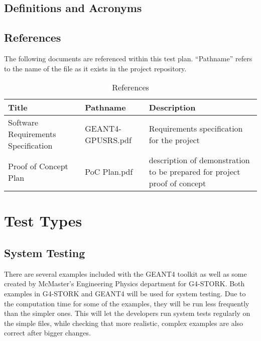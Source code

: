 \documentclass[12pt]{article}
\begin{document}
\subsection{Definitions and Acronyms} %

\subsection{References}
The following documents are referenced within this test plan. ``Pathname'' refers to the name of the file as it exists in the project repository.
\begin{table}[h]
\centering
\caption{References}\label{Table_References}
\begin{tabular}{>{\raggedright\arraybackslash}p{}>{\raggedright\arraybackslash}p{}>{\raggedright\arraybackslash}p{}}
\toprule
\bf Title & \bf Pathname & \bf Description\\\midrule
Software Requirements Specification & GEANT4-GPUSRS.pdf & Requirements specification for the project\\
Proof of Concept Plan & PoC Plan.pdf & description of demonstration to be prepared for project proof of concept\\
\bottomrule
\end{tabular}
\end{table}

\section{Test Types}

\subsection{System Testing} %
There are several examples included with the GEANT4 toolkit as well as some created by McMaster's Engineering Physics department for G4-STORK. Both examples in G4-STORK and GEANT4 will be used for system testing. Due to the computation time for some of the examples, they will be run less frequently than the simpler ones. This will let the developers run system tests regularly on the simple files, while checking that more realistic, complex examples are also correct after bigger changes.
\newpage
\end{document}
